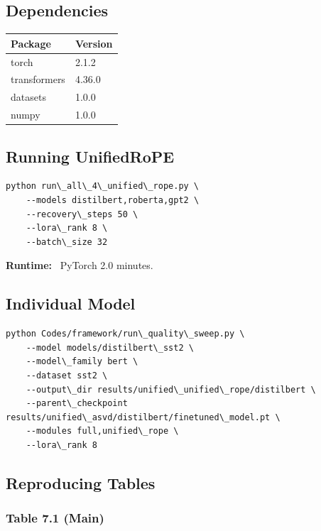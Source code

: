 \subsection{Dependencies}

\begin{table}[H]
\centering
\small
\begin{tabular}{ll}
\toprule
\textbf{Package} & \textbf{Version} \\
\midrule
torch & 2.1.2 \\
transformers & 4.36.0 \\
datasets & 1.0.0 \\
numpy & 1.0.0 \\
\bottomrule
\end{tabular}
\end{table}

\subsection{Running UnifiedRoPE}

\begin{lstlisting}
python run\_all\_4\_unified\_rope.py \
    --models distilbert,roberta,gpt2 \
    --recovery\_steps 50 \
    --lora\_rank 8 \
    --batch\_size 32
\end{lstlisting}

\textbf{Runtime:} ~PyTorch 2.0 minutes.

\subsection{Individual Model}

\begin{lstlisting}
python Codes/framework/run\_quality\_sweep.py \
    --model models/distilbert\_sst2 \
    --model\_family bert \
    --dataset sst2 \
    --output\_dir results/unified\_unified\_rope/distilbert \
    --parent\_checkpoint results/unified\_asvd/distilbert/finetuned\_model.pt \
    --modules full,unified\_rope \
    --lora\_rank 8
\end{lstlisting}

\subsection{Reproducing Tables}

\subsubsection{Table 7.1 (Main)}

